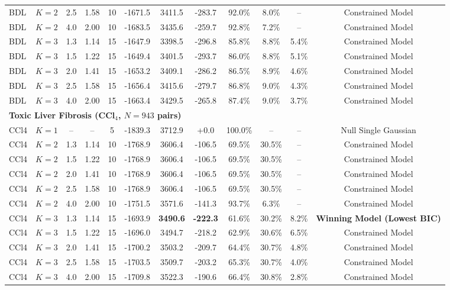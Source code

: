 \begin{landscape}
\begin{table}[p]
\begin{tabular*}{\linewidth}{@{\extracolsep{\fill}} llcccccccccc}
BDL & $K=2$ & 2.5 & 1.58 & 10 & -1671.5 & 3411.5 & -283.7 & 92.0\% & 8.0\% & -- & Constrained Model \\
BDL & $K=2$ & 4.0 & 2.00 & 10 & -1683.5 & 3435.6 & -259.7 & 92.8\% & 7.2\% & -- & Constrained Model \\
BDL & $K=3$ & 1.3 & 1.14 & 15 & -1647.9 & 3398.5 & -296.8 & 85.8\% & 8.8\% & 5.4\% & Constrained Model \\
BDL & $K=3$ & 1.5 & 1.22 & 15 & -1649.4 & 3401.5 & -293.7 & 86.0\% & 8.8\% & 5.1\% & Constrained Model \\
BDL & $K=3$ & 2.0 & 1.41 & 15 & -1653.2 & 3409.1 & -286.2 & 86.5\% & 8.9\% & 4.6\% & Constrained Model \\
BDL & $K=3$ & 2.5 & 1.58 & 15 & -1656.4 & 3415.6 & -279.7 & 86.8\% & 9.0\% & 4.3\% & Constrained Model \\
BDL & $K=3$ & 4.0 & 2.00 & 15 & -1663.4 & 3429.5 & -265.8 & 87.4\% & 9.0\% & 3.7\% & Constrained Model \\
\midrule
\multicolumn{12}{l}{\textbf{Toxic Liver Fibrosis (CCl$_4$, $N = 943$ pairs)}} \\
CCl4 & $K=1$ & -- & -- & 5 & -1839.3 & 3712.9 & +0.0 & 100.0\% & -- & -- & Null Single Gaussian \\
CCl4 & $K=2$ & 1.3 & 1.14 & 10 & -1768.9 & 3606.4 & -106.5 & 69.5\% & 30.5\% & -- & Constrained Model \\
CCl4 & $K=2$ & 1.5 & 1.22 & 10 & -1768.9 & 3606.4 & -106.5 & 69.5\% & 30.5\% & -- & Constrained Model \\
CCl4 & $K=2$ & 2.0 & 1.41 & 10 & -1768.9 & 3606.4 & -106.5 & 69.5\% & 30.5\% & -- & Constrained Model \\
CCl4 & $K=2$ & 2.5 & 1.58 & 10 & -1768.9 & 3606.4 & -106.5 & 69.5\% & 30.5\% & -- & Constrained Model \\
CCl4 & $K=2$ & 4.0 & 2.00 & 10 & -1751.5 & 3571.6 & -141.3 & 93.7\% & 6.3\% & -- & Constrained Model \\
\rowcolor[HTML]{E8F5E9} CCl4 & $K=3$ & 1.3 & 1.14 & 15 & -1693.9 & \textbf{3490.6} & \textbf{-222.3} & 61.6\% & 30.2\% & 8.2\% & \textbf{Winning Model (Lowest BIC)} \\
CCl4 & $K=3$ & 1.5 & 1.22 & 15 & -1696.0 & 3494.7 & -218.2 & 62.9\% & 30.6\% & 6.5\% & Constrained Model \\
CCl4 & $K=3$ & 2.0 & 1.41 & 15 & -1700.2 & 3503.2 & -209.7 & 64.4\% & 30.7\% & 4.8\% & Constrained Model \\
CCl4 & $K=3$ & 2.5 & 1.58 & 15 & -1703.5 & 3509.7 & -203.2 & 65.3\% & 30.7\% & 4.0\% & Constrained Model \\
CCl4 & $K=3$ & 4.0 & 2.00 & 15 & -1709.8 & 3522.3 & -190.6 & 66.4\% & 30.8\% & 2.8\% & Constrained Model \\
\bottomrule
\end{tabular*}
\end{table}
\end{landscape}

